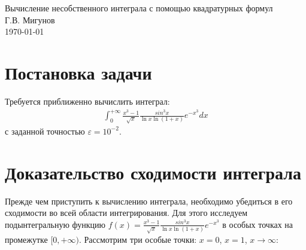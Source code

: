 \documentclass[titlepage]{article}
\begin{document}
 

\newtheorem{theorem}{Теорема}
\newtheorem{lemma}{Лемма}
\newtheorem{definition}{Определение}
\renewcommand{\proofname}{Доказательство}

\begin{center}
\hfill \break
\hfill \break
\hfill \break
\LARGE Вычисление несобственного интеграла с помощью квадратурных формул \\
\hfill \break
\large Г.В. Мигунов \\
\hfill \break
\today \\

\end{center}

\section{Постановка задачи}
Требуется приближенно вычислить интеграл: 
\begin{gather}
	\int_{0}^{+\infty}{\frac{x^3-1}{\sqrt{x}}\frac{sin^3{x}}{\ln{x}\ln{(1+x)}}e^{-x^3}dx}
\end{gather}
с заданной точностью $\varepsilon = 10^{-2}$.

\section{Доказательство сходимости интеграла}
Прежде чем приступить к вычислению интеграла, необходимо убедиться в его сходимости во всей области интегрирования. Для этого исследуем подынтегральную функцию $f(x) = \frac{x^3-1}{\sqrt{x}}\frac{sin^3{x}}{\ln{x}\ln{(1+x)}}e^{-x^3}$ в особых точках на промежутке $[0, +\infty)$. Рассмотрим три особые точки: $x = 0$, $x = 1$, $x \to \infty$:
\end{document}
